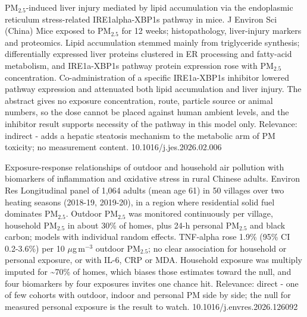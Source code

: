 \documentclass[10pt]{article}
\begin{document}
\par{}\baselineskip{}\baselineskip
{}

{PM$_{2.5}$-induced liver injury mediated by lipid accumulation via the endoplasmic reticulum stress-related IRE1alpha-XBP1s pathway in mice.}
{J Environ Sci (China)}
{Mice exposed to PM$_{2.5}$ for 12 weeks; histopathology, liver-injury markers and proteomics. Lipid accumulation stemmed mainly from triglyceride synthesis; differentially expressed liver proteins clustered in ER processing and fatty-acid metabolism, and IRE1a-XBP1s pathway protein expression rose with PM$_{2.5}$ concentration. Co-administration of a specific IRE1a-XBP1s inhibitor lowered pathway expression and attenuated both lipid accumulation and liver injury. The abstract gives no exposure concentration, route, particle source or animal numbers, so the dose cannot be placed against human ambient levels, and the inhibitor result supports necessity of the pathway in this model only. Relevance: indirect - adds a hepatic steatosis mechanism to the metabolic arm of PM toxicity; no measurement content.}
{10.1016/j.jes.2026.02.006}

{Exposure-response relationships of outdoor and household air pollution with biomarkers of inflammation and oxidative stress in rural Chinese adults.}
{Environ Res}
{Longitudinal panel of 1,064 adults (mean age 61) in 50 villages over two heating seasons (2018-19, 2019-20), in a region where residential solid fuel dominates PM$_{2.5}$. Outdoor PM$_{2.5}$ was monitored continuously per village, household PM$_{2.5}$ in about 30\% of homes, plus 24-h personal PM$_{2.5}$ and black carbon; models with individual random effects. TNF-alpha rose 1.9\% (95\% CI 0.2-3.6\%) per 10 $\mu$g\,m$^{-3}$ outdoor PM$_{2.5}$; no clear association for household or personal exposure, or with IL-6, CRP or MDA. Household exposure was multiply imputed for \textasciitilde{}70\% of homes, which biases those estimates toward the null, and four biomarkers by four exposures invites one chance hit. Relevance: direct - one of few cohorts with outdoor, indoor and personal PM side by side; the null for measured personal exposure is the result to watch.}
{10.1016/j.envres.2026.126092}
\end{document}
